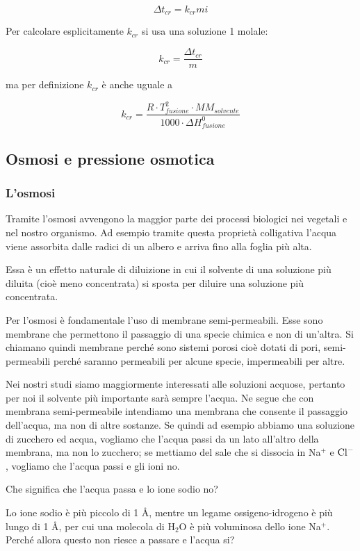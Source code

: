 $$\Delta t_{cr}=k_{cr} m i$$

Per calcolare esplicitamente $k_{cr}$ si usa una soluzione 1 molale:

$$k_{cr} = \frac{\Delta t_{cr}}{m}$$

ma per definizione $k_{cr}$ è anche uguale a

$$k_{cr}=\frac{R \cdot T_{fusione}^2 \cdot MM_{solvente}}{1000 \cdot \Delta H^0_{fusione}}$$

\subsection{Osmosi e pressione osmotica}
\subsubsection{L'osmosi}
Tramite l'osmosi avvengono la maggior parte dei processi biologici nei vegetali e nel nostro organismo. Ad esempio tramite questa proprietà colligativa l'acqua viene assorbita dalle radici di un albero e arriva fino alla foglia più alta.

Essa è un effetto naturale di diluizione in cui il solvente di una soluzione più diluita (cioè meno concentrata) si sposta per diluire una soluzione più concentrata.

Per l'osmosi è fondamentale l'uso di membrane semi-permeabili. Esse sono membrane che permettono il passaggio di una specie chimica e non di un'altra. Si chiamano quindi membrane perché sono sistemi porosi cioè dotati di pori, semi-permeabili perché saranno permeabili per alcune specie, impermeabili per altre.

Nei nostri studi siamo maggiormente interessati alle soluzioni acquose, pertanto per noi il solvente più importante sarà sempre l'acqua. Ne segue che con membrana semi-permeabile intendiamo una membrana che consente il passaggio dell'acqua, ma non di altre sostanze. Se quindi ad esempio abbiamo una soluzione di zucchero ed acqua, vogliamo che l'acqua passi da un lato all'altro della membrana, ma non lo zucchero; se mettiamo del sale che si dissocia in Na$^+$ e $\rm Cl^-$, vogliamo che l'acqua passi e gli ioni no.

Che significa che l'acqua passa e lo ione sodio no?

Lo ione sodio è più piccolo di 1 Å, mentre un legame ossigeno-idrogeno è più lungo di 1 Å, per cui una molecola di H$_2$O è più voluminosa dello ione Na$^+$. Perché allora questo non riesce a passare e l'acqua si?


